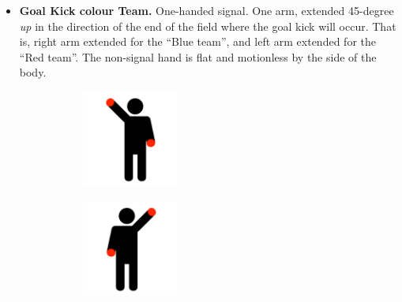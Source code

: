 \begin{itemize}
            
            \item \textbf{Goal Kick \textlangle{}colour\textrangle{} Team.}
            One-handed signal. One arm, extended 45-degree \emph{up} in the direction of the end of the field where the goal kick will occur. That is, right arm extended for the ``Blue team'', and left arm extended for the ``Red team''. The non-signal hand is flat and motionless by the side of the body.
            \begin{figure}[ht!]
                \centering
                \begin{subfigure}{.33\textwidth}
                  \includegraphics[height=120px]{figs/referee-signals/goal-kick.png}
                \end{subfigure}
                \begin{subfigure}{.33\textwidth}
                  \includegraphics[height=120px]{figs/referee-signals/goal-kick-flipped.png}
                \end{subfigure}
            \end{figure}



\end{itemize}
